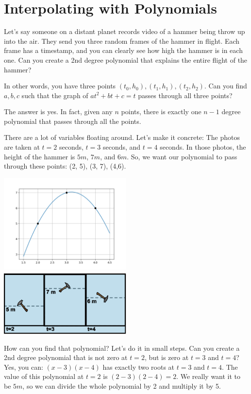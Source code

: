 \chapter{Interpolating with Polynomials}

Let's say someone on a distant planet records video of a hammer being
throw up into the air.  They send you three random frames of the
hammer in flight. Each frame has a timestamp, and you can clearly see
how high the hammer is in each one. Can you create a 2nd degree
polynomial that explains the entire flight of the hammer?

In other words, you have three points $(t_0, h_0), (t_1, h_1), (t_2, h_2)$.
Can you find $a,b,c$ such that the graph of $at^2 + bt + c = t$ passes
through all three points?

The answer is yes.  In fact, given any $n$ points, there is exactly
one $n-1$ degree polynomial that passes through all the points.

There are a lot of variables floating around. Let's make it concrete:
The photos are taken at $t = 2$ seconds, $t = 3$ seconds, and $t = 4$
seconds. In those photos, the height of the hammer is $5m$, $7m$, and
$6m$. So, we want our polynomial to pass through these points: (2, 5),
(3, 7), (4,6).

\includegraphics[width=0.5\textwidth]{interpolation.png} 
\includegraphics[width=0.5\textwidth]{hammer_1.png}


How can you find that polynomial? Let's do it in small steps. Can you
create a 2nd degree polynomial that is not zero at $t = 2$, but is zero
at $t = 3$ and $t = 4$? Yes, you can: $(x - 3)(x - 4)$ has
exactly two roots at $t = 3$ and $t = 4$.  The value of this polynomial at
$t = 2$ is $(2 - 3)(2 - 4) = 2$. We really want it to be $5m$, so
we can divide the whole polynomial by 2 and multiply it by 5.

